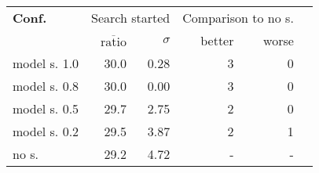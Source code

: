 \begin{tabular}{ l r r | r r r }
\hline 
\textbf{Conf.} & \multicolumn{2}{c|}{Search started} & \multicolumn{2}{c}{Comparison to no s.} \\ 
  & $\overline{\text{ratio}}$ & $\sigma$ & better & worse \\ 
\hline 
model s. 1.0 & 30.0 & 0.28 & 3 & 0 \\ 
model s. 0.8 & 30.0 & 0.00 & 3 & 0 \\
model s. 0.5 & 29.7 & 2.75 & 2 & 0 \\ 
model s. 0.2 & 29.5 & 3.87 & 2 & 1 \\
no s. & 29.2 & 4.72 & - & - \\ 
\hline 
\end{tabular}